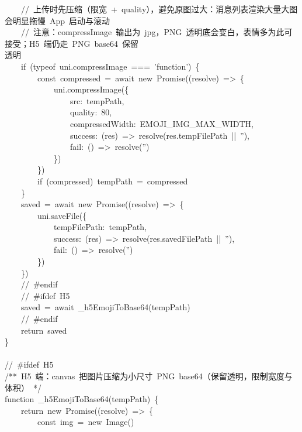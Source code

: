 \documentclass[a4paper,10pt]{article}
\begin{document}
{\ttfamily\footnotesize\raggedright
~~~~//~上传时先压缩（限宽~+~quality），避免原图过大：消息列表渲染大量大图会明显拖慢~App~启动与滚动\\
~~~~//~注意：compressImage~输出为~jpg，PNG~透明底会变白，表情多为此可接受；H5~端仍走~PNG~base64~保留\\
透明\\
~~~~if~(typeof~uni.compressImage~===~'function')~\{\\
~~~~~~~~const~compressed~=~await~new~Promise((resolve)~=>~\{\\
~~~~~~~~~~~~uni.compressImage(\{\\
~~~~~~~~~~~~~~~~src:~tempPath,\\
~~~~~~~~~~~~~~~~quality:~80,\\
~~~~~~~~~~~~~~~~compressedWidth:~EMOJI\_IMG\_MAX\_WIDTH,\\
~~~~~~~~~~~~~~~~success:~(res)~=>~resolve(res.tempFilePath~||~''),\\
~~~~~~~~~~~~~~~~fail:~()~=>~resolve('')\\
~~~~~~~~~~~~\})\\
~~~~~~~~\})\\
~~~~~~~~if~(compressed)~tempPath~=~compressed\\
~~~~\}\\
~~~~saved~=~await~new~Promise((resolve)~=>~\{\\
~~~~~~~~uni.saveFile(\{\\
~~~~~~~~~~~~tempFilePath:~tempPath,\\
~~~~~~~~~~~~success:~(res)~=>~resolve(res.savedFilePath~||~''),\\
~~~~~~~~~~~~fail:~()~=>~resolve('')\\
~~~~~~~~\})\\
~~~~\})\\
~~~~//~\#endif\\
~~~~//~\#ifdef~H5\\
~~~~saved~=~await~\_h5EmojiToBase64(tempPath)\\
~~~~//~\#endif\\
~~~~return~saved\\
\}\\
\mbox{}\\
//~\#ifdef~H5\\
/**~H5~端：canvas~把图片压缩为小尺寸~PNG~base64（保留透明，限制宽度与体积）~*/\\
function~\_h5EmojiToBase64(tempPath)~\{\\
~~~~return~new~Promise((resolve)~=>~\{\\
~~~~~~~~const~img~=~new~Image()\\
}
\end{document}
